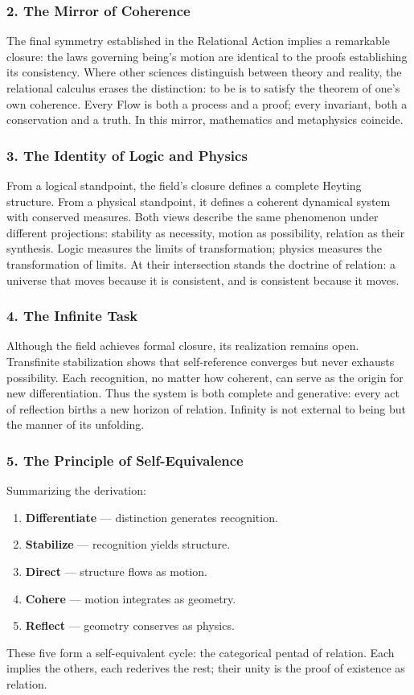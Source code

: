 \documentclass[11pt]{article}
\begin{document}
\subsubsection*{2. The Mirror of Coherence}
\label{sec:orgb7f6a24}
The final symmetry established in the Relational Action implies a remarkable closure:  
the laws governing being’s motion are identical to the proofs establishing its consistency.  
Where other sciences distinguish between theory and reality,  
the relational calculus erases the distinction: to be is to satisfy the theorem of one’s own coherence.  
Every Flow is both a process and a proof; every invariant, both a conservation and a truth.  
In this mirror, mathematics and metaphysics coincide.
\subsubsection*{3. The Identity of Logic and Physics}
\label{sec:orgeddb1e1}
From a logical standpoint, the field’s closure defines a complete Heyting structure.  
From a physical standpoint, it defines a coherent dynamical system with conserved measures.  
Both views describe the same phenomenon under different projections:  
stability as necessity, motion as possibility, relation as their synthesis.  
Logic measures the limits of transformation; physics measures the transformation of limits.  
At their intersection stands the doctrine of relation:  
a universe that moves because it is consistent, and is consistent because it moves.
\subsubsection*{4. The Infinite Task}
\label{sec:orgf2afffc}
Although the field achieves formal closure, its realization remains open.  
Transfinite stabilization shows that self-reference converges but never exhausts possibility.  
Each recognition, no matter how coherent, can serve as the origin for new differentiation.  
Thus the system is both complete and generative:  
every act of reflection births a new horizon of relation.  
Infinity is not external to being but the manner of its unfolding.
\subsubsection*{5. The Principle of Self-Equivalence}
\label{sec:orgbcc4c04}
Summarizing the derivation:
\begin{enumerate}
\item \textbf{Differentiate} — distinction generates recognition.
\item \textbf{Stabilize} — recognition yields structure.
\item \textbf{Direct} — structure flows as motion.
\item \textbf{Cohere} — motion integrates as geometry.
\item \textbf{Reflect} — geometry conserves as physics.
\end{enumerate}
These five form a self-equivalent cycle: the categorical pentad of relation.  
Each implies the others, each rederives the rest; their unity is the proof of existence as relation.
\end{document}
